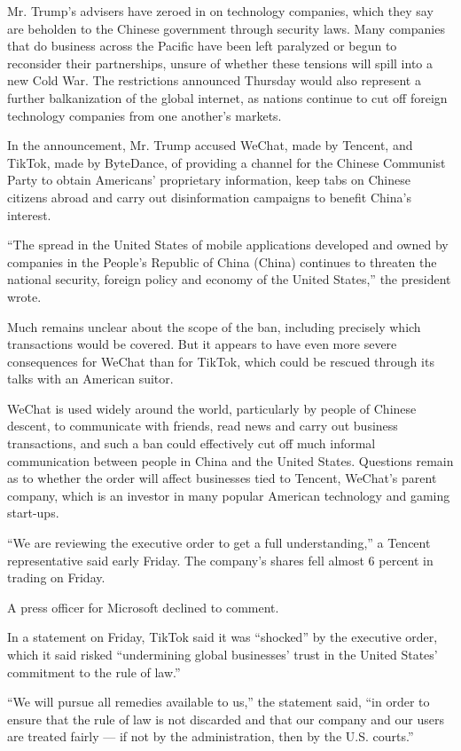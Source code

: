 Mr. Trump's advisers have zeroed in on technology companies, which they
say are beholden to the Chinese government through security laws. Many
companies that do business across the Pacific have been left paralyzed
or begun to reconsider their partnerships, unsure of whether these
tensions will spill into a new Cold War. The restrictions announced
Thursday would also represent a further balkanization of the global
internet, as nations continue to cut off foreign technology companies
from one another's markets.

In the announcement, Mr. Trump accused WeChat, made by Tencent, and
TikTok, made by ByteDance, of providing a channel for the Chinese
Communist Party to obtain Americans' proprietary information, keep tabs
on Chinese citizens abroad and carry out disinformation campaigns to
benefit China's interest.

``The spread in the United States of mobile applications developed and
owned by companies in the People's Republic of China (China) continues
to threaten the national security, foreign policy and economy of the
United States,'' the president wrote.

Much remains unclear about the scope of the ban, including precisely
which transactions would be covered. But it appears to have even more
severe consequences for WeChat than for TikTok, which could be rescued
through its talks with an American suitor.

WeChat is used widely around the world, particularly by people of
Chinese descent, to communicate with friends, read news and carry out
business transactions, and such a ban could effectively cut off much
informal communication between people in China and the United States.
Questions remain as to whether the order will affect businesses tied to
Tencent, WeChat's parent company, which is an investor in many popular
American technology and gaming start-ups.

``We are reviewing the executive order to get a full understanding,'' a
Tencent representative said early Friday. The company's shares fell
almost 6 percent in trading on Friday.

A press officer for Microsoft declined to comment.

In a statement on Friday, TikTok said it was ``shocked'' by the
executive order, which it said risked ``undermining global businesses'
trust in the United States' commitment to the rule of law.''

``We will pursue all remedies available to us,'' the statement said,
``in order to ensure that the rule of law is not discarded and that our
company and our users are treated fairly --- if not by the
administration, then by the U.S. courts.''

